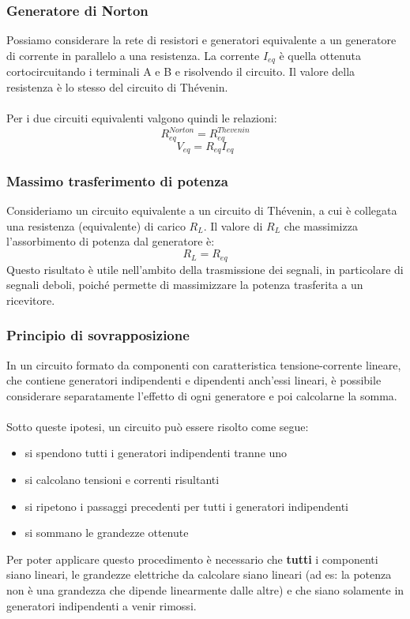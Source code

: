 \documentclass{article}
\begin{document}
\subsubsection{Generatore di Norton}
Possiamo considerare la rete di resistori e generatori equivalente a un generatore di corrente in parallelo a una resistenza.
La corrente $I_{eq}$ è quella ottenuta cortocircuitando i terminali A e B e risolvendo il circuito. Il valore della resistenza è lo stesso del circuito di Thévenin.\\\\
Per i due circuiti equivalenti valgono quindi le relazioni:
$$ R_{eq}^{Norton} = R_{eq}^{Thevenin}$$
$$ V_{eq} = R_{eq}I_{eq} $$

\subsubsection{Massimo trasferimento di potenza}
Consideriamo un circuito equivalente a un circuito di Thévenin, a cui è collegata una resistenza (equivalente) di carico $R_L$.
Il valore di $R_L$ che massimizza l'assorbimento di potenza dal generatore è:
$$ R_L=R_{eq} $$
Questo risultato è utile nell'ambito della trasmissione dei segnali, in particolare di segnali deboli, poiché permette di massimizzare la potenza trasferita a un ricevitore.

\subsubsection{Principio di sovrapposizione}
In un circuito formato da componenti con caratteristica tensione-corrente lineare, che contiene generatori indipendenti e dipendenti anch'essi lineari, è possibile considerare separatamente l'effetto di ogni generatore e poi calcolarne la somma.\\\\
Sotto queste ipotesi, un circuito può essere risolto come segue:
\begin{itemize}
    \item si spendono tutti i generatori indipendenti tranne uno
    \item si calcolano tensioni e correnti risultanti
    \item si ripetono i passaggi precedenti per tutti i generatori indipendenti
    \item si sommano le grandezze ottenute
\end{itemize}
Per poter applicare questo procedimento è necessario che \textbf{tutti} i componenti siano lineari, le grandezze elettriche da calcolare siano lineari (ad es: la potenza non è una grandezza che dipende linearmente dalle altre) e che siano solamente in generatori indipendenti a venir rimossi.






\newpage
\Index
\end{document}
